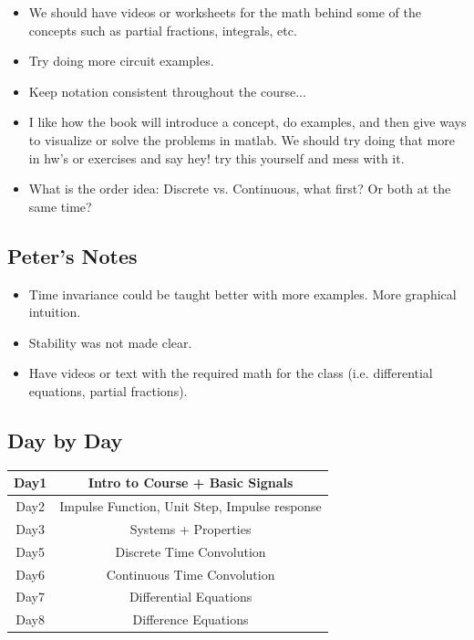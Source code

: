 \begin{itemize}

    \item We should have videos or worksheets for the math behind some of the concepts such as partial fractions, integrals, etc.
    \item Try doing more circuit examples.
    \item Keep notation consistent throughout the course...
    \item I like how the book will introduce a concept, do examples, and then give ways to visualize or solve the problems in matlab. We should try doing that more in hw's or exercises and say hey! try this yourself and mess with it.
    \item What is the order idea: Discrete vs. Continuous, what first? Or both at the same time?
\end{itemize}


\subsection{Peter's Notes}
\begin{itemize}
    \item Time invariance could be taught better with more examples. More graphical intuition.
    \item Stability was not made clear. 
    \item Have videos or text with the required math for the class (i.e. differential equations, partial fractions).
\end{itemize}

\subsection{Day by Day}

\begin{center}
    \begin{tabular}{ |c|c| } 
     \hline
     Day1 & Intro to Course + Basic Signals \\ 
     \hline
     Day2 & Impulse Function, Unit Step, Impulse response \\ 
     \hline
     Day3 & Systems + Properties \\ 
     \hline
     Day5 & Discrete Time Convolution \\ 
     \hline
     Day6 & Continuous Time Convolution \\ 
     \hline
     Day7 & Differential Equations\\ 
     \hline
     Day8 & Difference Equations \\ 
     \hline
    \end{tabular}
    \end{center}

